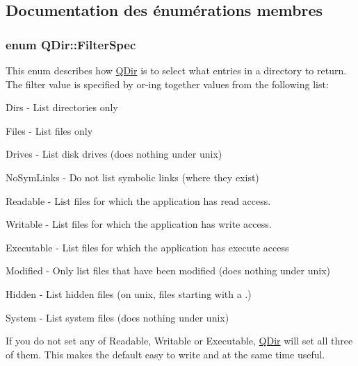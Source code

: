 \subsection{Documentation des énumérations membres}
\hypertarget{class_q_dir_a8b8c5b4f0028081f094c85129b8cc8b1}{}
\subsubsection[{Filter\+Spec}]{\setlength{\rightskip}{0pt plus 5cm}enum {\bf Q\+Dir\+::\+Filter\+Spec}}\label{class_q_dir_a8b8c5b4f0028081f094c85129b8cc8b1}
This enum describes how \hyperlink{class_q_dir}{Q\+Dir} is to select what entries in a directory to return. The filter value is specified by or-\/ing together values from the following list\+: 
\begin{DoxyItemize}
\item {\ttfamily Dirs} -\/ List directories only 
\item {\ttfamily Files} -\/ List files only


\item {\ttfamily Drives} -\/ List disk drives (does nothing under unix) 
\item {\ttfamily No\+Sym\+Links} -\/ Do not list symbolic links (where they exist) 
\item {\ttfamily Readable} -\/ List files for which the application has read access. 
\item {\ttfamily Writable} -\/ List files for which the application has write access. 
\item {\ttfamily Executable} -\/ List files for which the application has execute access 
\item {\ttfamily Modified} -\/ Only list files that have been modified (does nothing under unix) 
\item {\ttfamily Hidden} -\/ List hidden files (on unix, files starting with a .) 
\item {\ttfamily System} -\/ List system files (does nothing under unix) 
\end{DoxyItemize}

If you do not set any of {\ttfamily Readable}, {\ttfamily Writable} or {\ttfamily Executable}, \hyperlink{class_q_dir}{Q\+Dir} will set all three of them. This makes the default easy to write and at the same time useful.

